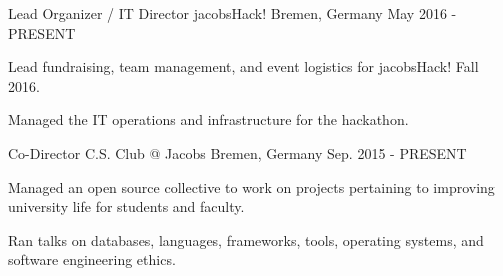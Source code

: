 

\begin{cventries}
  \cventry
    {Lead Organizer / IT Director} %
    {jacobsHack!} %
    {Bremen, Germany} %
    {May 2016 - PRESENT} %
    {
      \begin{cvitems} %
        \item {Lead fundraising, team management, and event logistics for jacobsHack! Fall 2016.}
        \item {Managed the IT operations and infrastructure for the hackathon.}
      \end{cvitems}
    }
  \cventry
    {Co-Director} %
    {C.S. Club @ Jacobs} %
    {Bremen, Germany} %
    {Sep. 2015 - PRESENT} %
    {
      \begin{cvitems} %
        \item {Managed an open source collective to work on projects pertaining to improving university life for students and faculty.}
        \item {Ran talks on databases, languages, frameworks, tools, operating systems, and software engineering ethics.}
      \end{cvitems}
    }
\end{cventries}
